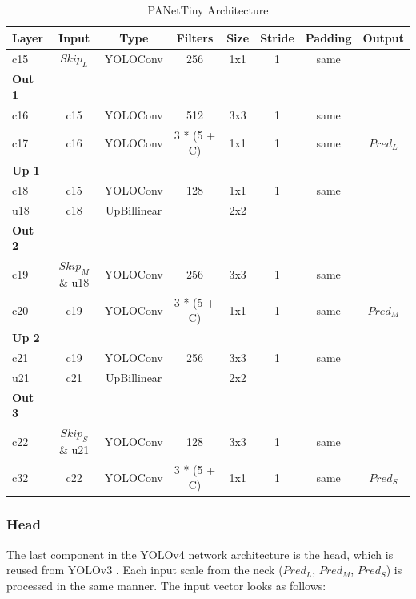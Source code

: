 \begin{table}
\begin{center}

\begin{tabular}{l|c|c|c|c|c|c|c}
    \textbf{Layer} & \textbf{Input} & \textbf{Type} & \textbf{Filters} & \textbf{Size} & \textbf{Stride} & \textbf{Padding} & \textbf{Output} \\
    \hline
    c15 & $Skip_L$ & YOLOConv & 256 & 1x1 & 1 & same\\
    \textbf{Out 1} & & & & & &\\
    c16 & c15 & YOLOConv & 512 & 3x3 & 1 & same\\
    c17 & c16 & YOLOConv & 3 * (5 + C) & 1x1 & 1 & same & $Pred_L$\\
    \textbf{Up 1}& & & & & &\\
    c18 & c15 & YOLOConv & 128 & 1x1 & 1 & same \\
    u18 & c18 & UpBillinear & & 2x2 & &\\
    \textbf{Out 2}& & & & & &\\
    c19 & $Skip_M$ \& u18 & YOLOConv & 256 & 3x3 & 1 & same\\
    c20 & c19 & YOLOConv & 3 * (5 + C) & 1x1 & 1 & same & $Pred_M$\\
    \textbf{Up 2}& & & & & &\\
    c21 & c19 & YOLOConv & 256 & 3x3 & 1 & same\\
    u21 & c21 & UpBillinear & & 2x2 & &\\
    \textbf{Out 3}& & & & & &\\
    c22 & $Skip_S$ \& u21 & YOLOConv & 128 & 3x3 & 1 & same\\
    c32 & c22 & YOLOConv & 3 * (5 + C) & 1x1 & 1 & same & $Pred_S$\\
\end{tabular}

\caption{PANetTiny Architecture}
\label{tab:panet_tiny_arch}
\end{center}
\end{table}


\subsubsection{Head}
The last component in the \ac{YOLOv4} network architecture is the head, which is reused from YOLOv3 \cite{yolov3}.
Each input scale from the neck ($Pred_{L}$, $Pred_{M}$, $Pred_{S}$) is processed in the same manner.
The input vector looks as follows:

